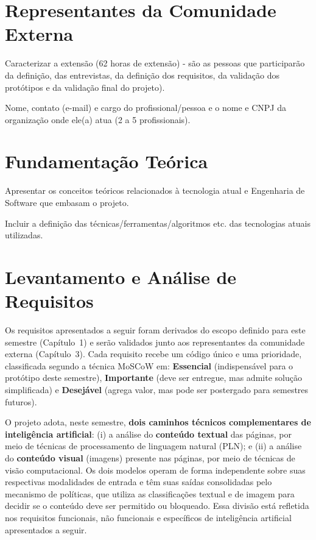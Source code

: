 \documentclass[
    12pt,           %
    oneside,        %
    a4paper,        %
    chapter=TITLE,  %
    english,        %
    brazil          %
]{abntex2}
\begin{document}
\chapter{Representantes da Comunidade Externa}

Caracterizar a extensão (62 horas de extensão) - são as pessoas que participarão da
definição, das entrevistas, da definição dos requisitos, da validação dos protótipos e da
validação final do projeto).

Nome, contato (e-mail) e cargo do profissional/pessoa e o nome e CNPJ da organização
onde ele(a) atua (2 a 5 profissionais).

\chapter{Fundamentação Teórica}

Apresentar os conceitos teóricos relacionados à tecnologia atual e Engenharia de Software
que embasam o projeto.

Incluir a definição das técnicas/ferramentas/algoritmos etc. das tecnologias atuais
utilizadas.

\chapter{Levantamento e Análise de Requisitos}

Os requisitos apresentados a seguir foram derivados do escopo definido para este
semestre (Capítulo~1) e serão validados junto aos representantes da comunidade
externa (Capítulo~3). Cada requisito recebe um código único e uma prioridade,
classificada segundo a técnica MoSCoW em: \textbf{Essencial} (indispensável para
o protótipo deste semestre), \textbf{Importante} (deve ser entregue, mas
admite solução simplificada) e \textbf{Desejável} (agrega valor, mas pode ser
postergado para semestres futuros).

O projeto adota, neste semestre, \textbf{dois caminhos técnicos complementares
de inteligência artificial}: (i) a análise do \textbf{conteúdo textual} das
páginas, por meio de técnicas de processamento de linguagem natural (PLN); e
(ii) a análise do \textbf{conteúdo visual} (imagens) presente nas páginas, por
meio de técnicas de visão computacional. Os dois modelos operam de forma
independente sobre suas respectivas modalidades de entrada e têm suas saídas
consolidadas pelo mecanismo de políticas, que utiliza as classificações
textual e de imagem para decidir se o conteúdo deve ser permitido ou
bloqueado. Essa divisão está refletida nos requisitos funcionais, não
funcionais e específicos de inteligência artificial apresentados a seguir.
\end{document}
